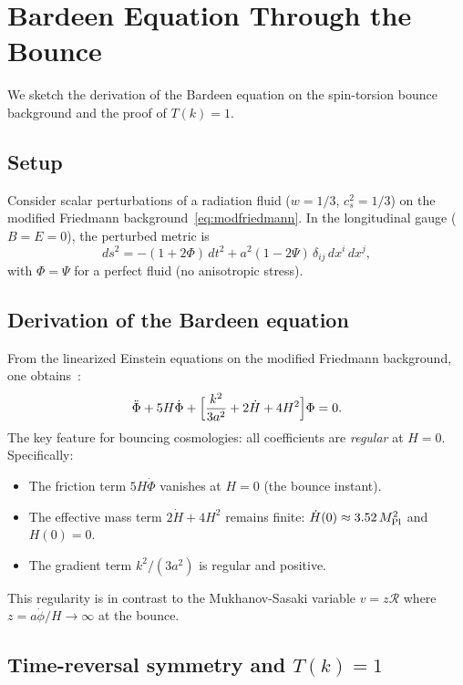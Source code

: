 \documentclass[aps,prd,twocolumn,superscriptaddress,showpacs,preprintnumbers,
  nofootinbib,longbibliography,floatfix]{revtex4-2}
\newcommand{\MPl}{M_{\rm Pl}}
\begin{document}
\section{Bardeen Equation Through the Bounce}\label{app:bardeen}

We sketch the derivation of the Bardeen equation on the spin-torsion
bounce background and the proof of $T(k) = 1$.

\subsection{Setup}

Consider scalar perturbations of a radiation fluid ($w = 1/3$,
$c_s^2 = 1/3$) on the modified Friedmann
background~\eqref{eq:modfriedmann}. In the longitudinal gauge
($B = E = 0$), the perturbed metric is
\begin{equation}
  ds^2 = -(1+2\Phi)\,dt^2 + a^2(1-2\Psi)\,\delta_{ij}\,dx^i\,dx^j,
\end{equation}
with $\Phi = \Psi$ for a perfect fluid (no anisotropic stress).

\subsection{Derivation of the Bardeen equation}

From the linearized Einstein equations on the modified Friedmann
background, one obtains~\cite{MukhanovFeldmanBrandenberger1992,
PeterPintoNeto2008}:
\begin{equation}\label{eq:bardeen_app}
  \ddot\Phi + 5H\dot\Phi +
  \Bigl[\frac{k^2}{3a^2} + 2\dot H + 4H^2\Bigr]\Phi = 0.
\end{equation}
The key feature for bouncing cosmologies: all coefficients are
\textit{regular} at $H = 0$. Specifically:
\begin{itemize}[leftmargin=*]
  \item The friction term $5H\dot\Phi$ vanishes at $H = 0$ (the bounce
    instant).
  \item The effective mass term $2\dot H + 4H^2$ remains finite:
    $\dot H(0) \approx 3.52\,\MPl^2$ and $H(0) = 0$.
  \item The gradient term $k^2/(3a^2)$ is regular and positive.
\end{itemize}
This regularity is in contrast to the Mukhanov-Sasaki variable
$v = z\mathcal{R}$ where $z = a\dot\phi/H \to \infty$ at the bounce.

\subsection{Time-reversal symmetry and $T(k) = 1$}
\end{document}
